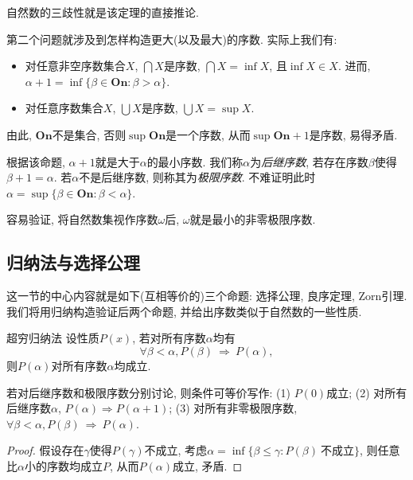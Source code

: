自然数的三歧性就是该定理的直接推论. 

第二个问题就涉及到怎样构造更大(以及最大)的序数. 实际上我们有: 

\begin{proposition}{}
	\vspace{-2em}
	\begin{itemize}
		\item 对任意非空序数集合$X$, $\bigcap X$是序数, $\bigcap X = \inf X$, 且$\inf X \in X$. 进而, $\alpha +1 = \inf \{ \beta \in \mathbf{On} : \beta > \alpha \}$. 
		\item 对任意序数集合$X$, $\bigcup X$是序数, $\bigcup X = \sup X$. 
	\end{itemize}
\end{proposition}

由此, $\mathbf{On}$不是集合, 否则$\sup \mathbf{On}$是一个序数, 从而$\sup \mathbf{On} + 1$是序数, 易得矛盾. 

根据该命题, $\alpha +1$就是大于$\alpha$的最小序数. 我们称$\alpha$为\textit{后继序数}, 若存在序数$\beta$使得$\beta +1 =\alpha$. 若$\alpha$不是后继序数, 则称其为\textit{极限序数}. 不难证明此时$\alpha = \sup \{ \beta \in \mathbf{On} :\beta < \alpha \}$. 

容易验证, 将自然数集视作序数$\omega$后, $\omega$就是最小的非零极限序数. 

\subsection{归纳法与选择公理}

这一节的中心内容就是如下(互相等价的)三个命题: 选择公理, 良序定理, Zorn引理. 我们将用归纳构造验证后两个命题, 并给出序数类似于自然数的一些性质. 

\begin{theorem}{超穷归纳法}
	设性质$P(x)$, 若对所有序数$\alpha$均有$$\forall \beta < \alpha , P(\beta) ~ \Rightarrow ~ P(\alpha),$$
	则$P(\alpha)$对所有序数$\alpha$均成立. 
\end{theorem}
\begin{remark}
	若对后继序数和极限序数分别讨论, 则条件可等价写作: (1) $P(0)$成立; (2) 对所有后继序数$\alpha$, $P(\alpha )\Rightarrow P(\alpha +1)$; (3) 对所有非零极限序数, $\forall \beta < \alpha , P(\beta) ~ \Rightarrow ~ P(\alpha)$. 
\end{remark}
\begin{proof}
	假设存在$\gamma$使得$P(\gamma)$不成立, 考虑$\alpha = \inf \{ \beta \leq \gamma : P(\beta)~\textit{不成立} \}$, 则任意比$\alpha$小的序数均成立$P$, 从而$P(\alpha)$成立, 矛盾. 
\end{proof}

